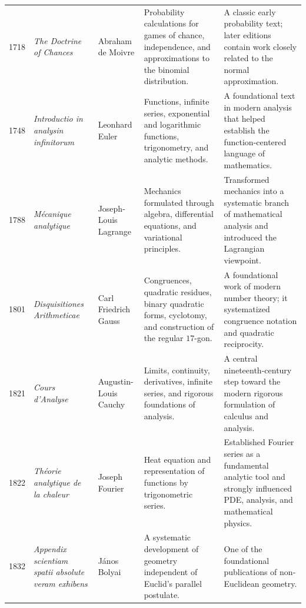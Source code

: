 {\begin{longtable}{@{}L{0.08\textwidth}L{0.21\textwidth}L{0.15\textwidth}L{0.22\textwidth}L{0.26\textwidth}@{}}
        1718
        & \textit{The Doctrine of Chances}
        & Abraham de Moivre
        & Probability calculations for games of chance, independence, and approximations to the binomial distribution.
        & A classic early probability text; later editions contain work closely related to the normal approximation. \\

        1748
        & \textit{Introductio in analysin infinitorum}
        & Leonhard Euler
        & Functions, infinite series, exponential and logarithmic functions, trigonometry, and analytic methods.
        & A foundational text in modern analysis that helped establish the function-centered language of mathematics. \\

        1788
        & \textit{M\'ecanique analytique}
        & Joseph-Louis Lagrange
        & Mechanics formulated through algebra, differential equations, and variational principles.
        & Transformed mechanics into a systematic branch of mathematical analysis and introduced the Lagrangian viewpoint. \\

        1801
        & \textit{Disquisitiones Arithmeticae}
        & Carl Friedrich Gauss
        & Congruences, quadratic residues, binary quadratic forms, cyclotomy, and construction of the regular $17$-gon.
        & A foundational work of modern number theory; it systematized congruence notation and quadratic reciprocity. \\

        1821
        & \textit{Cours d'Analyse}
        & Augustin-Louis Cauchy
        & Limits, continuity, derivatives, infinite series, and rigorous foundations of analysis.
        & A central nineteenth-century step toward the modern rigorous formulation of calculus and analysis. \\

        1822
        & \textit{Th\'eorie analytique de la chaleur}
        & Joseph Fourier
        & Heat equation and representation of functions by trigonometric series.
        & Established Fourier series as a fundamental analytic tool and strongly influenced PDE, analysis, and mathematical physics. \\

        1832
        & \textit{Appendix scientiam spatii absolute veram exhibens}
        & J\'anos Bolyai
        & A systematic development of geometry independent of Euclid's parallel postulate.
        & One of the foundational publications of non-Euclidean geometry. \\


\end{longtable}}
